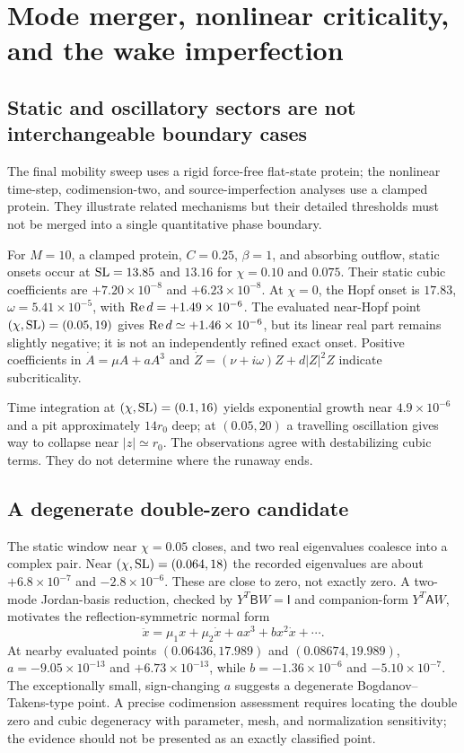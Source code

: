 \section{Mode merger, nonlinear criticality, and the wake imperfection}
\subsection{Static and oscillatory sectors are not interchangeable boundary cases}
The final mobility sweep uses a rigid force-free flat-state protein; the nonlinear time-step, codimension-two, and source-imperfection analyses use a clamped protein. They illustrate related mechanisms but their detailed thresholds must not be merged into a single quantitative phase boundary.

For $M=10$, a clamped protein, $C=0.25$, $\beta=1$, and absorbing outflow, static onsets occur at $\mathrm{SL}=13.85$ and $13.16$ for $\chi=0.10$ and $0.075$. Their static cubic coefficients are $+7.20\times10^{-8}$ and $+6.23\times10^{-8}$. At $\chi=0$, the Hopf onset is $17.83$, $\omega=5.41\times10^{-5}$, with $\operatorname{Re} d=+1.49\times10^{-6}$. The evaluated near-Hopf point $(\chi,\mathrm{SL})=(0.05,19)$ gives $\operatorname{Re} d\simeq+1.46\times10^{-6}$, but its linear real part remains slightly negative; it is not an independently refined exact onset. Positive coefficients in $\dot A=\mu A+aA^3$ and $\dot Z=(\nu+i\omega)Z+d|Z|^2Z$ indicate subcriticality.

Time integration at $(\chi,\mathrm{SL})=(0.1,16)$ yields exponential growth near $4.9\times10^{-6}$ and a pit approximately $14r_0$ deep; at $(0.05,20)$ a travelling oscillation gives way to collapse near $|z|\simeq r_0$. The observations agree with destabilizing cubic terms. They do not determine where the runaway ends.

\subsection{A degenerate double-zero candidate}
The static window near $\chi=0.05$ closes, and two real eigenvalues coalesce into a complex pair. Near $(\chi,\mathrm{SL})=(0.064,18)$ the recorded eigenvalues are about $+6.8\times10^{-7}$ and $-2.8\times10^{-6}$. These are close to zero, not exactly zero. A two-mode Jordan-basis reduction, checked by $Y^T\mathsf BW=\mathsf I$ and companion-form $Y^T\mathsf AW$, motivates the reflection-symmetric normal form
\begin{equation}
\ddot x=\mu_1x+\mu_2\dot x+a x^3+b x^2\dot x+\cdots .
\end{equation}
At nearby evaluated points $(0.06436,17.989)$ and $(0.08674,19.989)$, $a=-9.05\times10^{-13}$ and $+6.73\times10^{-13}$, while $b=-1.36\times10^{-6}$ and $-5.10\times10^{-7}$. The exceptionally small, sign-changing $a$ suggests a degenerate Bogdanov--Takens-type point. A precise codimension assessment requires locating the double zero and cubic degeneracy with parameter, mesh, and normalization sensitivity; the evidence should not be presented as an exactly classified point.

